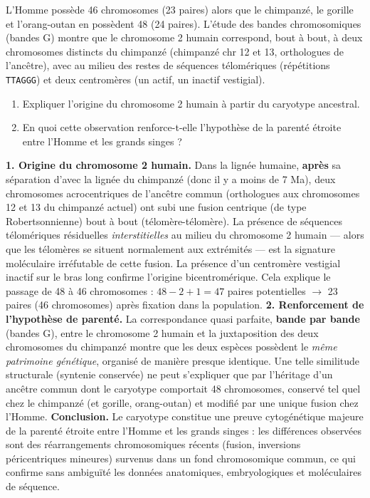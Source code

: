 \documentclass[11pt]{article}
\newcommand{\cle}[1]{{\popxbold\color{popdark}#1}}
\begin{document}
\begin{exoresolu}
L'Homme possède 46 chromosomes (23 paires) alors que le chimpanzé, le gorille et l'orang-outan en possèdent 48 (24 paires). L'étude des bandes chromosomiques (bandes G) montre que le chromosome 2 humain correspond, bout à bout, à deux chromosomes distincts du chimpanzé (chimpanzé chr 12 et 13, orthologues de l'ancêtre), avec au milieu des restes de séquences télomériques (répétitions \texttt{TTAGGG}) et deux centromères (un actif, un inactif vestigial).
\begin{enumerate}
\item Expliquer l'origine du chromosome 2 humain à partir du caryotype ancestral.
\item En quoi cette observation renforce-t-elle l'hypothèse de la parenté étroite entre l'Homme et les grands singes ?
\end{enumerate}
\tcblower
\textbf{1. Origine du chromosome 2 humain.} Dans la lignée humaine, \textbf{après} sa séparation d'avec la lignée du chimpanzé (donc il y a moins de 7 Ma), deux chromosomes acrocentriques de l'ancêtre commun (orthologues aux chromosomes 12 et 13 du chimpanzé actuel) ont subi une \cle{fusion centrique (de type Robertsonnienne)} bout à bout (télomère-télomère). La présence de séquences télomériques résiduelles \emph{interstitielles} au milieu du chromosome 2 humain — alors que les télomères se situent normalement aux extrémités — est la signature moléculaire irréfutable de cette fusion. La présence d'un centromère vestigial inactif sur le bras long confirme l'origine bicentromérique. Cela explique le passage de 48 à 46 chromosomes : $48 - 2 + 1 = 47$ paires potentielles $\rightarrow$ 23 paires (46 chromosomes) après fixation dans la population.
\textbf{2. Renforcement de l'hypothèse de parenté.} La correspondance quasi parfaite, \textbf{bande par bande} (bandes G), entre le chromosome 2 humain et la juxtaposition des deux chromosomes du chimpanzé montre que les deux espèces possèdent le \emph{même patrimoine génétique}, organisé de manière presque identique. Une telle similitude structurale (syntenie conservée) ne peut s'expliquer que par l'héritage d'un \cle{ancêtre commun} dont le caryotype comportait 48 chromosomes, conservé tel quel chez le chimpanzé (et gorille, orang-outan) et modifié par une unique fusion chez l'Homme.
\textbf{Conclusion.} Le caryotype constitue une preuve cytogénétique majeure de la parenté étroite entre l'Homme et les grands singes : les différences observées sont des réarrangements chromosomiques récents (fusion, inversions péricentriques mineures) survenus dans un fond chromosomique commun, ce qui confirme sans ambiguïté les données anatomiques, embryologiques et moléculaires de séquence.
\end{exoresolu}
\end{document}
